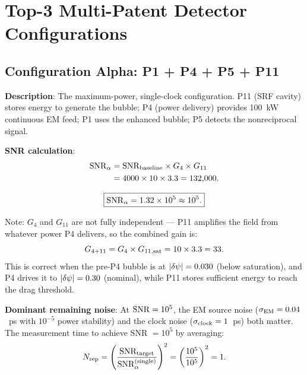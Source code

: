 \section{Top-3 Multi-Patent Detector Configurations}
\label{sec:top3}

\subsection{Configuration Alpha: P1 + P4 + P5 + P11}
\label{ssec:config_alpha}

\textbf{Description}: The maximum-power, single-clock configuration. P11
(SRF cavity) stores energy to generate the bubble; P4 (power delivery)
provides 100~kW continuous EM feed; P1 uses the enhanced bubble; P5 detects
the nonreciprocal signal.

\textbf{SNR calculation}:
\begin{align}
\mathrm{SNR}_\alpha &= \mathrm{SNR}_{\rm baseline} \times G_4 \times G_{11} \notag\\
&= 4000 \times 10 \times 3.3 = 132{,}000.
\label{eq:SNR_alpha}
\end{align}

\begin{equation}
\boxed{\mathrm{SNR}_\alpha = 1.32\times 10^{5} \approx 10^5.}
\label{eq:SNR_alpha_box}
\end{equation}

Note: $G_4$ and $G_{11}$ are not fully independent --- P11 amplifies the
field from whatever power P4 delivers, so the combined gain is:
\begin{equation}
G_{4+11} = G_4 \times G_{11,\rm sat} = 10 \times 3.3 = 33.
\label{eq:G411}
\end{equation}
This is correct when the pre-P4 bubble is at $|\delta\psi| = 0.030$ (below
saturation), and P4 drives it to $|\delta\psi| = 0.30$ (nominal), while P11
stores sufficient energy to reach the drag threshold.

\textbf{Dominant remaining noise}: At $\mathrm{SNR} = 10^5$, the EM source noise
($\sigma_{\rm EM} = 0.04$~ps with $10^{-5}$ power stability) and the clock
noise ($\sigma_{\rm clock} = 1$~ps) both matter. The measurement time to
achieve SNR $= 10^5$ by averaging:
\begin{equation}
N_{\rm rep} = \left(\frac{\mathrm{SNR}_{\rm target}}{\mathrm{SNR}_\alpha^{(\rm single)}}\right)^2
= \left(\frac{10^5}{10^5}\right)^2 = 1.
\label{eq:reps_alpha}
\end{equation}

